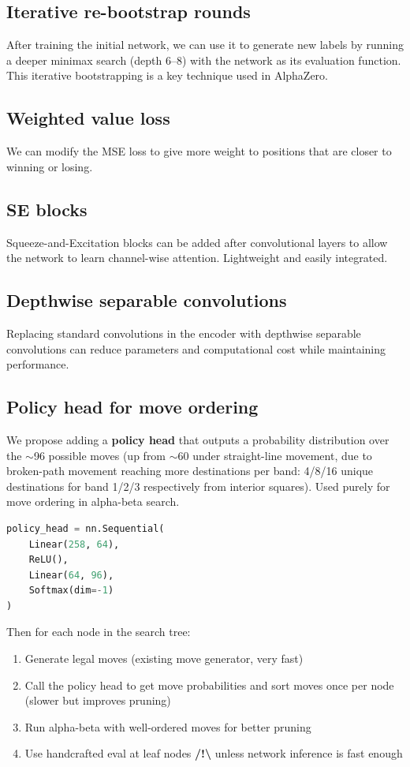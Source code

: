 \documentclass[11pt,a4paper]{article}
\begin{document}
\subsection{Iterative re-bootstrap rounds}
After training the initial network, we can use it to generate new labels by running a deeper minimax search (depth 6--8) with the network as its evaluation function. This iterative bootstrapping is a key technique used in AlphaZero.

\subsection{Weighted value loss}
We can modify the MSE loss to give more weight to positions that are closer to winning or losing.

\subsection{SE blocks}
Squeeze-and-Excitation blocks can be added after convolutional layers to allow the network to learn channel-wise attention. Lightweight and easily integrated.

\subsection{Depthwise separable convolutions}
Replacing standard convolutions in the encoder with depthwise separable convolutions can reduce parameters and computational cost while maintaining performance.

\subsection{Policy head for move ordering}
We propose adding a \textbf{policy head} that outputs a probability distribution over the $\sim$96 possible moves (up from $\sim$60 under straight-line movement, due to broken-path movement reaching more destinations per band: 4/8/16 unique destinations for band 1/2/3 respectively from interior squares). Used purely for move ordering in alpha-beta search.

\begin{lstlisting}[language=Python]
policy_head = nn.Sequential(
    Linear(258, 64),
    ReLU(),
    Linear(64, 96),
    Softmax(dim=-1)
)
\end{lstlisting}

Then for each node in the search tree:
\begin{enumerate}
  \item Generate legal moves (existing move generator, very fast)
  \item Call the policy head to get move probabilities and sort moves once per node (slower but improves pruning)
  \item Run alpha-beta with well-ordered moves for better pruning
  \item Use handcrafted eval at leaf nodes \textbf{/!\textbackslash} unless network inference is fast enough
\end{enumerate}
\end{document}

